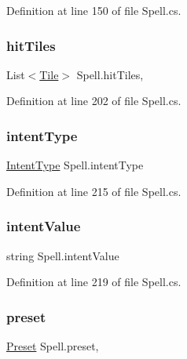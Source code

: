 Definition at line 150 of file Spell.\+cs.

\mbox{\label{class_spell_abf3b41d24f9983b5d6a970e17379a05c}} 
\subsubsection{\texorpdfstring{hitTiles}{hitTiles}}
{\footnotesize\ttfamily List$<$\mbox{\hyperlink{class_tile}{Tile}}$>$ Spell.\+hit\+Tiles\hspace{0.3cm}{\ttfamily [get]}, {\ttfamily [set]}}



Definition at line 202 of file Spell.\+cs.

\mbox{\label{class_spell_abe2debb79464b4f7a9985005efe98ecb}} 
\subsubsection{\texorpdfstring{intentType}{intentType}}
{\footnotesize\ttfamily \mbox{\hyperlink{class_spell_a602b82de554076b542544262e7a95f19}{Intent\+Type}} Spell.\+intent\+Type\hspace{0.3cm}{\ttfamily [get]}}



Definition at line 215 of file Spell.\+cs.

\mbox{\label{class_spell_a0829aca41b73bbbd14adea27fc373c80}} 
\subsubsection{\texorpdfstring{intentValue}{intentValue}}
{\footnotesize\ttfamily string Spell.\+intent\+Value\hspace{0.3cm}{\ttfamily [get]}}



Definition at line 219 of file Spell.\+cs.

\mbox{\label{class_spell_a5f19de819de784c8f273d52417009f54}} 
\subsubsection{\texorpdfstring{preset}{preset}}
{\footnotesize\ttfamily \mbox{\hyperlink{class_spell_a5520e850e7000a6156b3456672b72ed1}{Preset}} Spell.\+preset\hspace{0.3cm}{\ttfamily [get]}, {\ttfamily [set]}}



